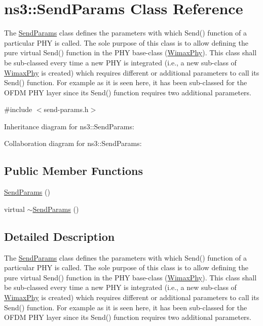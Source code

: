 \hypertarget{classns3_1_1SendParams}{}\section{ns3\+:\+:Send\+Params Class Reference}
\label{classns3_1_1SendParams}


The \hyperlink{classns3_1_1SendParams}{Send\+Params} class defines the parameters with which Send() function of a particular P\+HY is called. The sole purpose of this class is to allow defining the pure virtual Send() function in the P\+HY base-\/class (\hyperlink{classns3_1_1WimaxPhy}{Wimax\+Phy}). This class shall be sub-\/classed every time a new P\+HY is integrated (i.\+e., a new sub-\/class of \hyperlink{classns3_1_1WimaxPhy}{Wimax\+Phy} is created) which requires different or additional parameters to call its Send() function. For example as it is seen here, it has been sub-\/classed for the O\+F\+DM P\+HY layer since its Send() function requires two additional parameters.  




{\ttfamily \#include $<$send-\/params.\+h$>$}



Inheritance diagram for ns3\+:\+:Send\+Params\+:


Collaboration diagram for ns3\+:\+:Send\+Params\+:
\subsection*{Public Member Functions}
\begin{DoxyCompactItemize}
\item 
\hyperlink{classns3_1_1SendParams_a1454a7653f165704d82fe8eeb302d492}{Send\+Params} ()
\item 
virtual \hyperlink{classns3_1_1SendParams_a180f7cd239a0b041fbbcf36d90569d93}{$\sim$\+Send\+Params} ()
\end{DoxyCompactItemize}


\subsection{Detailed Description}
The \hyperlink{classns3_1_1SendParams}{Send\+Params} class defines the parameters with which Send() function of a particular P\+HY is called. The sole purpose of this class is to allow defining the pure virtual Send() function in the P\+HY base-\/class (\hyperlink{classns3_1_1WimaxPhy}{Wimax\+Phy}). This class shall be sub-\/classed every time a new P\+HY is integrated (i.\+e., a new sub-\/class of \hyperlink{classns3_1_1WimaxPhy}{Wimax\+Phy} is created) which requires different or additional parameters to call its Send() function. For example as it is seen here, it has been sub-\/classed for the O\+F\+DM P\+HY layer since its Send() function requires two additional parameters. 

